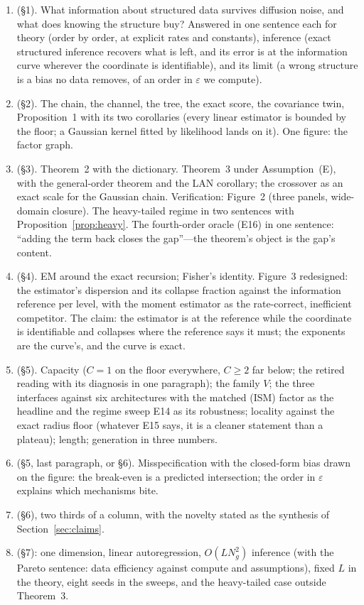 \begin{enumerate}
\item {} (\S1). What information about structured data survives diffusion noise, and what does knowing the structure buy? Answered in one sentence each for theory (order by order, at explicit rates and constants), inference (exact structured inference recovers what is left, and its error is at the information curve wherever the coordinate is identifiable), and its limit (a wrong structure is a bias no data removes, of an order in $\varepsilon$ we compute).
\item {} (\S2). The chain, the channel, the tree, the exact score, the covariance twin, Proposition~1 with its two corollaries (every linear estimator is bounded by the floor; a Gaussian kernel fitted by likelihood lands on it). One figure: the factor graph.
\item {} (\S3). Theorem~2 with the dictionary. Theorem~3 under Assumption~(E), with the general-order theorem and the LAN corollary; the crossover as an exact scale for the Gaussian chain. Verification: Figure~2 (three panels, wide-domain closure). The heavy-tailed regime in two sentences with Proposition~\ref{prop:heavy}. The fourth-order oracle (E16) in one sentence: ``adding the term back closes the gap''---the theorem's object is the gap's content.
\item {} (\S4). EM around the exact recursion; Fisher's identity. Figure~3 redesigned: the estimator's dispersion and its collapse fraction against the information reference per level, with the moment estimator as the rate-correct, inefficient competitor. The claim: the estimator is at the reference while the coordinate is identifiable and collapses where the reference says it must; the exponents are the curve's, and the curve is exact.
\item {} (\S5). Capacity ($C=1$ on the floor everywhere, $C\ge2$ far below; the retired reading with its diagnosis in one paragraph); the family $V$; the three interfaces against six architectures with the matched (ISM) factor as the headline and the regime sweep E14 as its robustness; locality against the exact radius floor (whatever E15 says, it is a cleaner statement than a plateau); length; generation in three numbers.
\item {} (\S5, last paragraph, or \S6). Misspecification with the closed-form bias drawn on the figure: the break-even is a predicted intersection; the order in $\varepsilon$ explains which mechanisms bite.
\item {} (\S6), two thirds of a column, with the novelty stated as the synthesis of Section~\ref{sec:claims}.
\item {} (\S7): one dimension, linear autoregression, $O(LN_g^2)$ inference (with the Pareto sentence: data efficiency against compute and assumptions), fixed $L$ in the theory, eight seeds in the sweeps, and the heavy-tailed case outside Theorem~3.
\end{enumerate}

